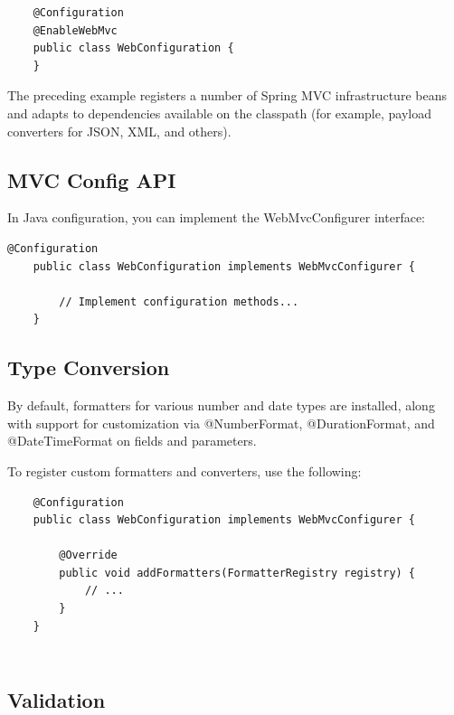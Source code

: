 \documentclass{scrartcl}
\begin{document}
\begin{lstlisting}
    @Configuration
    @EnableWebMvc
    public class WebConfiguration {
    }
\end{lstlisting}

The preceding example registers a number of Spring MVC infrastructure beans and adapts to dependencies available on the classpath (for example, payload converters for JSON, XML, and others).

\subsection{MVC Config API}

In Java configuration, you can implement the WebMvcConfigurer interface:

\begin{lstlisting}@Configuration
    public class WebConfiguration implements WebMvcConfigurer {

        // Implement configuration methods...
    }
\end{lstlisting}

\subsection{Type Conversion}

By default, formatters for various number and date types are installed, along with support for customization via @NumberFormat, @DurationFormat, and @DateTimeFormat on fields and parameters.

To register custom formatters and converters, use the following:

\begin{lstlisting}
    @Configuration
    public class WebConfiguration implements WebMvcConfigurer {

        @Override
        public void addFormatters(FormatterRegistry registry) {
            // ...
        }
    }
\end{lstlisting}

\begin{lstlisting}
\end{lstlisting}

\begin{lstlisting}
\end{lstlisting}

\subsection{Validation}
\end{document}
